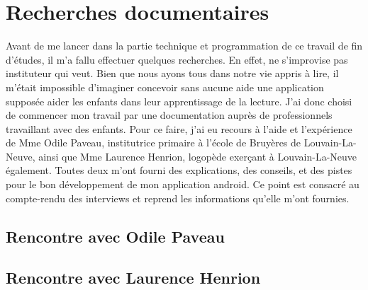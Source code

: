 \section{Recherches documentaires}
Avant de me lancer dans la partie technique et programmation de ce travail de fin d'études, il m'a fallu effectuer quelques recherches. En effet, ne s'improvise pas instituteur qui veut. Bien que nous ayons tous dans notre vie appris à lire, il m'était impossible d'imaginer concevoir sans aucune aide une application supposée aider les enfants dans leur apprentissage de la lecture. J'ai donc choisi de commencer mon travail par une documentation auprès de professionnels travaillant avec des enfants. Pour ce faire, j'ai eu recours à l'aide et l'expérience de Mme Odile Paveau, institutrice primaire à l'école de Bruyères de Louvain-La-Neuve, ainsi que Mme Laurence Henrion, logopède exerçant à Louvain-La-Neuve également. Toutes deux m'ont fourni des explications, des conseils, et des pistes pour le bon développement de mon application android. Ce point est consacré au compte-rendu des interviews et reprend les informations qu'elle m'ont fournies.

\subsection{Rencontre avec Odile Paveau\label{Freinet}}
\subsection{Rencontre avec Laurence Henrion}